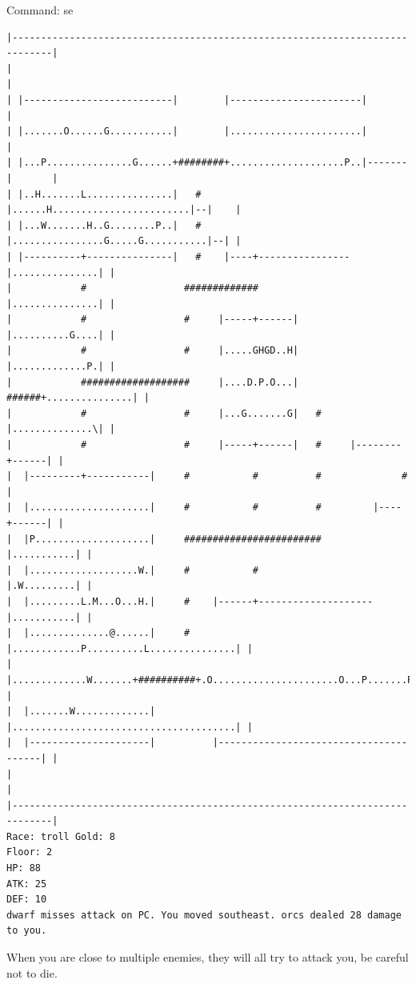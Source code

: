 \documentclass[11pt]{article}
\theoremstyle{plain}
\begin{document}
Command: se
\begin{Verbatim}[fontsize=\scriptsize]
|-----------------------------------------------------------------------------|
|                                                                             |
| |--------------------------|        |-----------------------|               |
| |.......O......G...........|        |.......................|               |
| |...P...............G......+########+....................P..|-------|       |
| |..H.......L...............|   #    |......H........................|--|    |
| |...W.......H..G........P..|   #    |................G.....G...........|--| |
| |----------+---------------|   #    |----+----------------|...............| |
|            #                 #############                |...............| |
|            #                 #     |-----+------|         |..........G....| |
|            #                 #     |.....GHGD..H|         |.............P.| |
|            ###################     |....D.P.O...|   ######+...............| |
|            #                 #     |...G.......G|   #     |..............\| |
|            #                 #     |-----+------|   #     |--------+------| |
|  |---------+-----------|     #           #          #              #        |
|  |.....................|     #           #          #         |----+------| |
|  |P....................|     ########################         |...........| |
|  |...................W.|     #           #                    |.W.........| |
|  |.........L.M...O...H.|     #    |------+--------------------|...........| |
|  |..............@......|     #    |............P..........L...............| |
|  |.............W.......+##########+.O......................O...P.......P..| |
|  |.......W.............|          |.......................................| |
|  |---------------------|          |---------------------------------------| |
|                                                                             |
|-----------------------------------------------------------------------------|
Race: troll Gold: 8                                                    Floor: 2
HP: 88
ATK: 25
DEF: 10
dwarf misses attack on PC. You moved southeast. orcs dealed 28 damage to you. 
\end{Verbatim}

When you are close to multiple enemies, they will all try to attack you,
be careful not to die.
\end{document}
